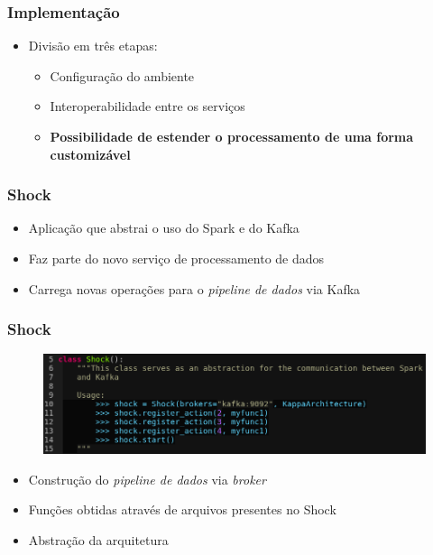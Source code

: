 \documentclass{beamer}
\begin{document}
  \begin{frame}
      \frametitle{Implementação}
      \begin{itemize}
          \item Divisão em três etapas:
              \begin{itemize}
                  \item Configuração do ambiente
                  \item Interoperabilidade entre os serviços
                  \item \textbf{Possibilidade de estender o processamento de uma forma customizável}
              \end{itemize}
      \end{itemize}
  \end{frame}

  \begin{frame}
      \frametitle{Shock}
      \begin{itemize}
          \item Aplicação que abstrai o uso do Spark e do Kafka
          \item Faz parte do novo serviço de processamento de dados
          \item Carrega novas operações para o \textit{pipeline de dados} via Kafka
      \end{itemize}
  \end{frame}

  \begin{frame}
      \frametitle{Shock}
      \begin{figure}
          \includegraphics[width=\textwidth]{figures/ShockResult1.png}
      \end{figure}
      \begin{itemize}
          \item Construção do \textit{pipeline de dados} via \textit{broker}
          \item Funções obtidas através de arquivos presentes no Shock
          \item Abstração da arquitetura
      \end{itemize}
  \end{frame}
\end{document}
